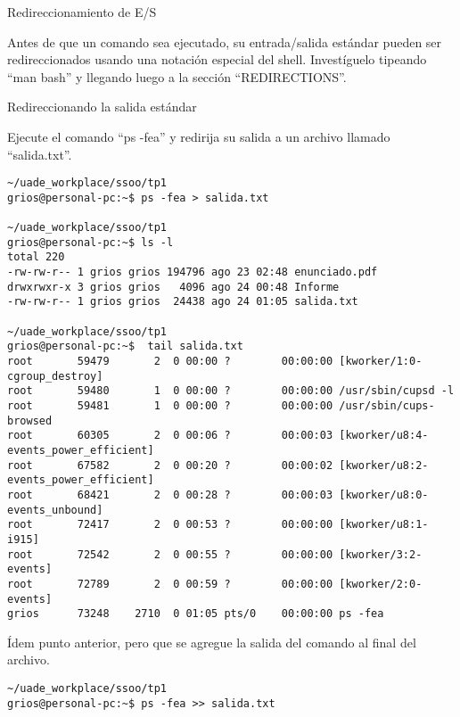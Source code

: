 \begin{section}{Redireccionamiento de E/S}

\begin{quoting}
Antes de que un comando sea ejecutado, su entrada/salida estándar pueden ser redireccionados
usando una notación especial del shell. Investíguelo tipeando “man bash” y llegando luego a la sección
“REDIRECTIONS”.
\end{quoting}

\begin{subsection}{Redireccionando la salida estándar}

\begin{quoting}
Ejecute el comando “ps -fea” y redirija su salida a un archivo llamado “salida.txt”.
\end{quoting}
\begin{lstlisting}[style=Ubuntu]
~/uade_workplace/ssoo/tp1
grios@personal-pc:~$ ps -fea > salida.txt

~/uade_workplace/ssoo/tp1
grios@personal-pc:~$ ls -l 
total 220
-rw-rw-r-- 1 grios grios 194796 ago 23 02:48 enunciado.pdf
drwxrwxr-x 3 grios grios   4096 ago 24 00:48 Informe
-rw-rw-r-- 1 grios grios  24438 ago 24 01:05 salida.txt

~/uade_workplace/ssoo/tp1
grios@personal-pc:~$  tail salida.txt 
root       59479       2  0 00:00 ?        00:00:00 [kworker/1:0-cgroup_destroy]
root       59480       1  0 00:00 ?        00:00:00 /usr/sbin/cupsd -l
root       59481       1  0 00:00 ?        00:00:00 /usr/sbin/cups-browsed
root       60305       2  0 00:06 ?        00:00:03 [kworker/u8:4-events_power_efficient]
root       67582       2  0 00:20 ?        00:00:02 [kworker/u8:2-events_power_efficient]
root       68421       2  0 00:28 ?        00:00:03 [kworker/u8:0-events_unbound]
root       72417       2  0 00:53 ?        00:00:00 [kworker/u8:1-i915]
root       72542       2  0 00:55 ?        00:00:00 [kworker/3:2-events]
root       72789       2  0 00:59 ?        00:00:00 [kworker/2:0-events]
grios      73248    2710  0 01:05 pts/0    00:00:00 ps -fea

\end{lstlisting}

\begin{quoting}
Ídem punto anterior, pero que se agregue la salida del comando al final del archivo.
\end{quoting}
\begin{lstlisting}[style=Ubuntu]
~/uade_workplace/ssoo/tp1
grios@personal-pc:~$ ps -fea >> salida.txt


\end{lstlisting}
\end{subsection}
\end{section}
